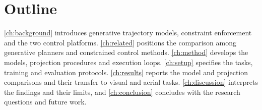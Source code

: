 \section{Outline}\label{sec:intro:outline}

\autoref{ch:background} introduces generative trajectory models, constraint enforcement and the two
control platforms. \autoref{ch:related} positions the comparison among generative planners and
constrained control methods. \autoref{ch:method} develops the models, projection procedures and
execution loops. \autoref{ch:setup} specifies the tasks, training and evaluation protocols.
\autoref{ch:results} reports the model and projection comparisons and their transfer to visual and
aerial tasks. \autoref{ch:discussion} interprets the findings and their limits, and
\autoref{ch:conclusion} concludes with the research questions and future work.

